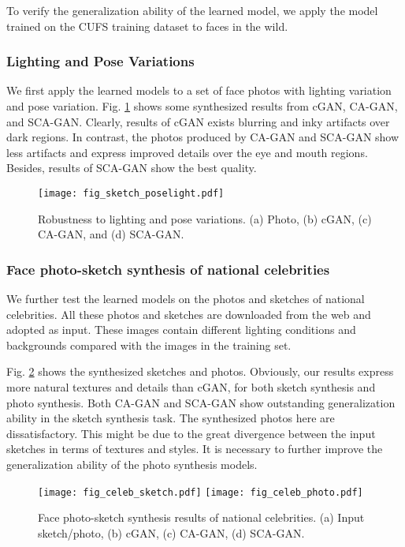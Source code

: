 \documentclass[journal]{IEEEtran}
\begin{document}
To verify the generalization ability of the learned model, we apply the model trained on the CUFS training dataset to faces in the wild.

\subsubsection{Lighting and Pose Variations} 
\label{sec:robust_light_pose}
We first apply the learned models to a set of face photos with lighting variation and pose variation. Fig. \ref{fig:crossdata_sketch} shows some synthesized results from cGAN, CA-GAN, and SCA-GAN. Clearly, results of cGAN exists blurring and inky artifacts over dark regions. In contrast, the photos produced by CA-GAN and SCA-GAN show less artifacts and express improved details over the eye and mouth regions. Besides, results of SCA-GAN show the best quality. 

\begin{figure}
\centering
\texttt{[image: fig\_sketch\_poselight.pdf]}
   \vspace{-0.4cm}
\caption{Robustness to lighting and pose variations. (a) Photo, (b) cGAN, (c) CA-GAN, and (d) SCA-GAN. }
\label{fig:crossdata_sketch}
   \vspace{-0.3cm}
\end{figure}

\subsubsection{Face photo-sketch synthesis of national celebrities} 
\label{sec:celeb}

We further test the learned models on the photos and sketches of national celebrities. 
All these photos and sketches are downloaded from the web and adopted as input. These images contain different lighting conditions and backgrounds compared with the images in the training set. 

Fig. \ref{fig:celeb_ps} shows the synthesized sketches and photos. Obviously, our results express more natural textures and details than cGAN, for both sketch synthesis and photo synthesis. Both CA-GAN and SCA-GAN show outstanding generalization ability in the sketch synthesis task. The synthesized photos here are dissatisfactory. This might be due to the great divergence between the input sketches in terms of textures and styles. It is necessary to further improve the generalization ability of the photo synthesis models.


\begin{figure}
\centering
\texttt{[image: fig\_celeb\_sketch.pdf]}
\texttt{[image: fig\_celeb\_photo.pdf]}
  \vspace{-0.4cm}
\caption{Face photo-sketch synthesis results of national celebrities. (a) Input sketch/photo, (b) cGAN, (c) CA-GAN, (d) SCA-GAN. }
\label{fig:celeb_ps}
   \vspace{-0.4cm}
\end{figure}
\end{document}
